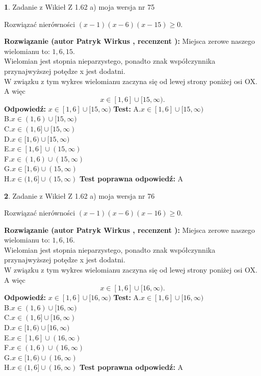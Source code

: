 \documentclass[12pt, a4paper]{article}
\theoremstyle{definition} %
\newtheorem{zad}{}
\newcommand{\zadStart}[1]{\begin{zad}#1\newline}
\newcommand{\zadStop}{\end{zad}}
\newcommand{\rozwStart}[2]{\noindent \textbf{Rozwiązanie (autor #1 , recenzent #2): }\newline}
\newcommand{\rozwStop}{\newline}
\newcommand{\odpStart}{\noindent \textbf{Odpowiedź:}\newline}
\newcommand{\odpStop}{\newline}
\newcommand{\testStart}{\noindent \textbf{Test:}\newline}
\newcommand{\testStop}{\newline}
\newcommand{\kluczStart}{\noindent \textbf{Test poprawna odpowiedź:}\newline}
\newcommand{\kluczStop}{\newline}
\begin{document}
\zadStart{Zadanie z Wikieł Z 1.62 a) moja wersja nr 75}

Rozwiązać nierówności $(x-1)(x-6)(x-15)\ge0$.
\zadStop
\rozwStart{Patryk Wirkus}{}
Miejsca zerowe naszego wielomianu to: $1, 6, 15$.\\
Wielomian jest stopnia nieparzystego, ponadto znak współczynnika przy\linebreak najwyższej potędze x jest dodatni.\\ W związku z tym wykres wielomianu zaczyna się od lewej strony poniżej osi OX. A więc $$x \in [1,6] \cup [15,\infty).$$
\rozwStop
\odpStart
$x \in [1,6] \cup [15,\infty)$
\odpStop
\testStart
A.$x \in [1,6] \cup [15,\infty)$\\
B.$x \in (1,6) \cup [15,\infty)$\\
C.$x \in (1,6] \cup [15,\infty)$\\
D.$x \in [1,6) \cup [15,\infty)$\\
E.$x \in [1,6] \cup (15,\infty)$\\
F.$x \in (1,6) \cup (15,\infty)$\\
G.$x \in [1,6) \cup (15,\infty)$\\
H.$x \in (1,6] \cup (15,\infty)$
\testStop
\kluczStart
A
\kluczStop



\zadStart{Zadanie z Wikieł Z 1.62 a) moja wersja nr 76}

Rozwiązać nierówności $(x-1)(x-6)(x-16)\ge0$.
\zadStop
\rozwStart{Patryk Wirkus}{}
Miejsca zerowe naszego wielomianu to: $1, 6, 16$.\\
Wielomian jest stopnia nieparzystego, ponadto znak współczynnika przy\linebreak najwyższej potędze x jest dodatni.\\ W związku z tym wykres wielomianu zaczyna się od lewej strony poniżej osi OX. A więc $$x \in [1,6] \cup [16,\infty).$$
\rozwStop
\odpStart
$x \in [1,6] \cup [16,\infty)$
\odpStop
\testStart
A.$x \in [1,6] \cup [16,\infty)$\\
B.$x \in (1,6) \cup [16,\infty)$\\
C.$x \in (1,6] \cup [16,\infty)$\\
D.$x \in [1,6) \cup [16,\infty)$\\
E.$x \in [1,6] \cup (16,\infty)$\\
F.$x \in (1,6) \cup (16,\infty)$\\
G.$x \in [1,6) \cup (16,\infty)$\\
H.$x \in (1,6] \cup (16,\infty)$
\testStop
\kluczStart
A
\kluczStop
\end{document}
